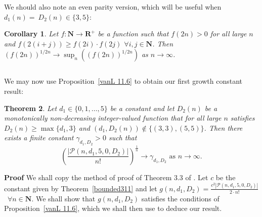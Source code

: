 \documentclass{article}
\newtheorem{Theorem}{Theorem}
\newtheorem{Corollary}[Theorem]{Corollary}
\newtheorem{Proof of Theorem}{Proof of Theorem}
\begin{document}
We should also note an even parity version,
which will be useful when $d_{1}(n)=~D_{2}(n) \in \{ 3,5 \}$:















\begin{Corollary} \label{bounded103}
Let $f:\mathbf{N} \to \mathbf{R}^{+}$ be a function such that
$f(2n)>0$ for all large $n$ and
$f(2(i+j)) \geq f(2i) \cdot f(2j)$ $\forall i,j \in \mathbf{N}$.
Then $(f(2n))^{1/2n} \to \sup_{n} \left( (f(2n))^{1/2n} \right)$ as $n \to \infty$. 
\end{Corollary}
\begin{displaymath}
\end{displaymath} 















We may now use Proposition~\ref{vanL 11.6} to obtain our first growth constant result:















\begin{Theorem} \label{bounded104}
Let $d_{1} \in \{ 0,1, \ldots, 5 \}$ be a constant and 
let $D_{2}(n)$ be a monotonically non-decreasing integer-valued function that for all large $n$ satisfies
$D_{2}(n) \geq \max \{ d_{1}, 3 \}$ and $(d_{1},D_{2}(n)) \notin \{ (3,3), (5,5) \}$.
Then there exists a \emph{finite} constant $\gamma_{d_{1},D_{2}} >0$ such that
\begin{displaymath}
\left( \frac{|\mathcal{P}(n,d_{1},5,0,D_{2})|}{n!} \right)^{\frac{1}{n}} \to 
\gamma_{d_{1},D_{2}} 
\textrm{ as } n \to \infty.
\end{displaymath}
\end{Theorem}
\textbf{Proof}
We shall copy the method of proof of Theorem 3.3 of \cite{mcd}.
Let $c$ be the constant given by Theorem~\ref{bounded311} and
let $g(n,d_{1},D_{2}) = \frac{c^{2}|\mathcal{P}(n,d_{1},5,0,D_{2})|}{2 \cdot n!}$~$\forall n \in \mathbf{N}$.
We shall show that $g(n,d_{1},D_{2})$ satisfies the conditions of Proposition~\ref{vanL 11.6},
which we shall then use to deduce our result. \\
\end{document}
